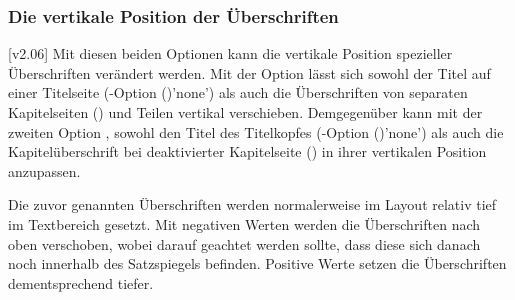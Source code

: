 \begin{Declaration*}{}
\begin{Declaration*}{}
\begin{Declaration*}{}
\subsubsection{Die vertikale Position der Überschriften}
\begin{Declaration}[v2.05]{}
\begin{Declaration}[v2.05]{}
\printdeclarationlist%
%
%
%
[v2.06]
Mit diesen beiden Optionen kann die vertikale Position spezieller Überschriften 
verändert werden. Mit der Option  lässt sich sowohl 
der Titel auf einer Titelseite 
(\KOMAScript-Option ()'none') als 
auch die Überschriften von separaten Kapitelseiten () 
und Teilen vertikal verschieben. Demgegenüber kann mit der zweiten Option 
, sowohl den Titel des Titelkopfes 
(\KOMAScript-Option ()'none') als 
auch die Kapitelüberschrift bei deaktivierter Kapitelseite 
() in ihrer vertikalen Position anzupassen.

Die zuvor genannten Überschriften werden normalerweise im Layout relativ tief 
im Textbereich gesetzt. Mit negativen Werten werden die Überschriften nach oben 
verschoben, wobei darauf geachtet werden sollte, dass diese sich danach noch 
innerhalb des Satzspiegels befinden. Positive Werte setzen die Überschriften 
dementsprechend tiefer.
%
\end{Declaration}
\end{Declaration}




\end{Declaration*}
\end{Declaration*}
\end{Declaration*}
